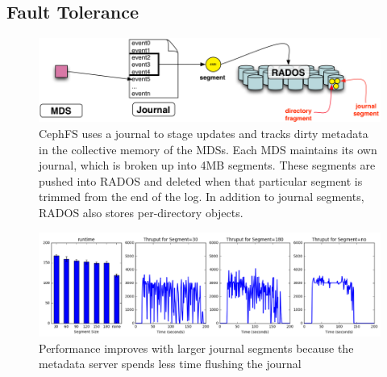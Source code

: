 \subsection{Fault Tolerance}
\label{sec:fault-tolerance}
\begin{figure}[tb] \centering
\includegraphics[width=1\textwidth]{./figures/journal.png} 
\caption{CephFS uses a journal to stage updates and tracks dirty metadata in
the collective memory of the MDSs. Each MDS maintains its own journal, which is
broken up into 4MB segments. These segments are pushed into RADOS and deleted
when that particular segment is trimmed from the end of the log. In addition to
journal segments, RADOS also stores per-directory objects. \label{fig:journal}}
\end{figure}

\begin{figure}[tb]%
\centering
\includegraphics[width=180mm]{figures/throughput-journal.png}
\caption{Performance improves with larger journal segments because the metadata
server spends less time flushing the journal }\label{fig:throughput-journal}
\end{figure}


